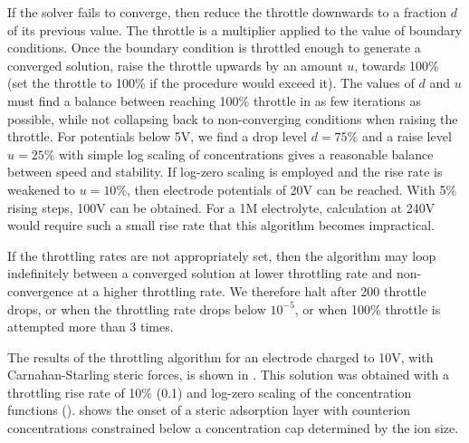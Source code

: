 If the solver fails to converge, then reduce the throttle downwards to
a fraction $d$ of its previous value. The throttle is a multiplier
applied to the value of boundary conditions.  Once the boundary
condition is throttled enough to generate a converged solution, raise
the throttle upwards by an amount $u$, towards 100\% (set the throttle
to 100\% if the procedure would exceed it).  The values of $d$ and $u$
must find a balance between reaching 100\% throttle in as few
iterations as possible, while not collapsing back to non-converging
conditions when raising the throttle.  For potentials below 5V, we
find a drop level $d=75\%$ and a raise level $u=25\%$ with simple log
scaling of concentrations gives a reasonable balance between speed and
stability. If log-zero scaling is employed and the rise rate is
weakened to $u=10\%$, then electrode potentials of 20V can be
reached. With 5\% rising steps, 100V can be obtained. For a 1M
electrolyte, calculation at 240V would require such a small rise rate
that this algorithm becomes impractical.

If the throttling rates are not appropriately set, then the algorithm
may loop indefinitely between a converged solution at lower throttling
rate and non-convergence at a higher throttling rate. We therefore
halt after 200 throttle drops, or when the throttling rate drops below
$10^{-5}$, or when 100\% throttle is attempted more than 3 times.

The results of the throttling algorithm for an electrode charged to
10V, with Carnahan-Starling steric forces, is shown in
. This solution was obtained with a
throttling rise rate of 10\% (0.1) and log-zero scaling of the
concentration functions
().  shows the onset
of a steric adsorption layer \cite{DagmawiParsons2022} with counterion
concentrations constrained below a concentration cap determined by the
ion size.

